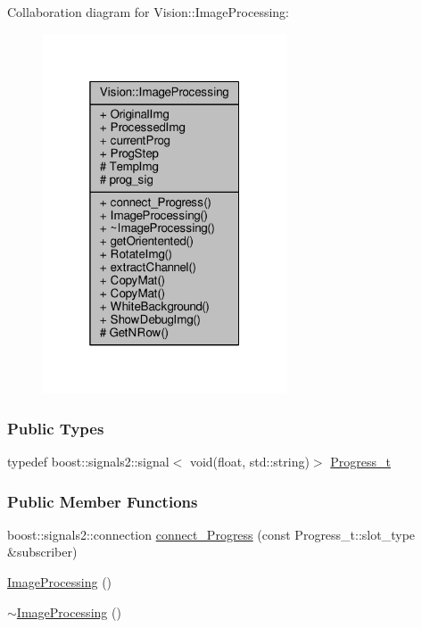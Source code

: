 Collaboration diagram for Vision\+:\+:Image\+Processing\+:
\nopagebreak
\begin{figure}[H]
\begin{center}
\leavevmode
\includegraphics[width=205pt]{class_vision_1_1_image_processing__coll__graph}
\end{center}
\end{figure}
\subsubsection*{Public Types}
\begin{DoxyCompactItemize}
\item 
typedef boost\+::signals2\+::signal$<$ void(float, std\+::string)$>$ \hyperlink{class_vision_1_1_image_processing_ade0de8f6751f8d19b8fbb9533a009d3c}{Progress\+\_\+t}
\end{DoxyCompactItemize}
\subsubsection*{Public Member Functions}
\begin{DoxyCompactItemize}
\item 
boost\+::signals2\+::connection \hyperlink{class_vision_1_1_image_processing_a013b9623c6a2933ec5f78b13a450994d}{connect\+\_\+\+Progress} (const Progress\+\_\+t\+::slot\+\_\+type \&subscriber)
\item 
\hyperlink{class_vision_1_1_image_processing_a0090ffe36a912d6df5d7a1f507f6252e}{Image\+Processing} ()
\item 
\hyperlink{class_vision_1_1_image_processing_a1d4bd00ec1862112552c663034cebabc}{$\sim$\+Image\+Processing} ()
\end{DoxyCompactItemize}
